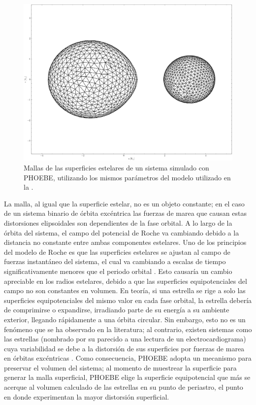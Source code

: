 \begin{figure}[!ht]
	\centering
	\includegraphics[scale=0.42]{Introduccion/Figures/Figura PHOEBE Malla.png}
	\caption{Mallas de las superficies estelares de un sistema simulado con
	PHOEBE, utilizando los mismos parámetros del modelo utilizado en la
	.}
	\label{figuraPhoebeMalla}
\end{figure}

La malla, al igual que la superficie estelar, no es un objeto constante; en el
caso de un sistema binario de órbita excéntrica las fuerzas de marea que causan
estas distorsiones elipsoidales son dependientes de la fase orbital. A lo largo
de la órbita del sistema, el campo del potencial de Roche va cambiando debido a
la distancia no constante entre ambas componentes estelares. Uno de los
principios del modelo de Roche es que las superficies estelares se ajustan al
campo de fuerzas instantáneo del sistema, el cual va cambiando a escalas de
tiempo significativamente menores que el periodo orbital
. Esto causaría un
cambio apreciable en los radios estelares, debido a que las superficies
equipotenciales del campo no son constantes en volumen. En teoría, si una
estrella se rige a solo las superficies equipotenciales del mismo valor en cada
fase orbital, la estrella debería de comprimirse o expandirse, irradiando parte
de su energía a su ambiente exterior, llegando rápidamente a una órbita
circular. Sin embargo, esto no es un fenómeno que se ha observado en la
literatura; al contrario, existen sistemas como las estrellas 
(nombrado por su parecido a una lectura de un electrocardiograma) cuya
variabilidad se debe a la distorsión de sus superficies por fuerzas de marea en
órbitas excéntricas
.
Como consecuencia, PHOEBE adopta un mecanismo para preservar el volumen del
sistema; al momento de muestrear la superficie para generar la malla
superficial, PHOEBE elige la superficie equipotencial que más se acerque al
volumen calculado de las estrellas en su punto de periastro, el punto en donde
experimentan la mayor distorsión superficial.

